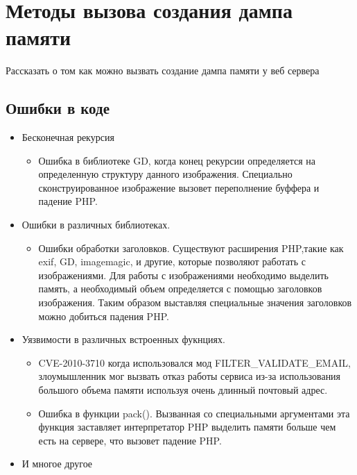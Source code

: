 \documentclass[20pt]{article}
\begin{document}
\newpage

\section{Методы вызова создания дампа памяти}
Рассказать о том как можно вызвать создание дампа памяти у веб сервера

\subsection{Ошибки в коде}
\begin{itemize}
  \item  Бесконечная рекурсия
    \begin{itemize}
      \item Ошибка в библиотеке GD, когда конец рекурсии определяется на определенную
      структуру данного изображения. Специально сконструированное изображение вызовет
      переполнение буффера и падение PHP.
    \end{itemize}
  \item Ошибки в различных библиотеках.
    \begin{itemize}
      \item Ошибки обработки заголовков. Существуют расширения PHP,такие как exif, GD,
        imagemagic, и другие, которые позволяют работать с изображениями. Для работы
        с изображениями необходимо выделить память, а необходимый объем определяется
        с помощью заголовков изображения. Таким образом выставляя специальные значения
        заголовков можно добиться падения PHP.
    \end{itemize}
  \item Уязвимости в различных встроенных фукнциях.
    \begin{itemize}
      \item CVE-2010-3710 когда использовался мод FILTER\_VALIDATE\_EMAIL, злоумышленник
        мог вызвать отказ работы сервиса из-за использования большого объема памяти
        используя очень длинный почтовый адрес.
      \item Ошибка в функции pack(). Вызванная со специальными аргументами эта функция
        заставляет интерпретатор PHP выделить памяти больше чем есть на сервере, что
        вызовет падение PHP.
    \end{itemize}
 \item И многое другое
\end{itemize}

\newpage
\end{document}
